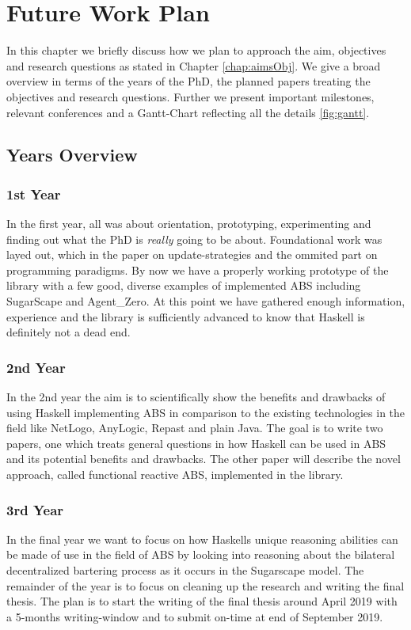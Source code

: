 \chapter{Future Work Plan}
\label{chap:future}

In this chapter we briefly discuss how we plan to approach the aim, objectives and research questions as stated in Chapter \ref{chap:aimsObj}. We give a broad overview in terms of the years of the PhD, the planned papers treating the objectives and research questions. Further we present important milestones, relevant conferences and a Gantt-Chart reflecting all the details \ref{fig:gantt}.


\section{Years Overview}

\subsection{1st Year}
In the first year, all was about orientation, prototyping, experimenting and finding out what the PhD is \textit{really} going to be about. Foundational work was layed out, which in the paper on update-strategies and the ommited part on programming paradigms. By now we have a properly working prototype of the library with a few good, diverse examples of implemented ABS including SugarScape and Agent\_Zero. At this point we have gathered enough information, experience and the library is sufficiently advanced to know that Haskell is definitely not a dead end.

\subsection{2nd Year}
In the 2nd year the aim is to scientifically show the benefits and drawbacks of using Haskell implementing ABS in comparison to the existing technologies in the field like NetLogo, AnyLogic, Repast and plain Java. The goal is to write two papers, one which treats general questions in how Haskell can be used in ABS and its potential benefits and drawbacks. The other paper will describe the novel approach, called functional reactive ABS, implemented in the library. 

\subsection{3rd Year}
In the final year we want to focus on how Haskells unique reasoning abilities can be made of use in the field of ABS by looking into reasoning about the bilateral decentralized bartering process as it occurs in the Sugarscape model.
The remainder of the year is to focus on cleaning up the research and writing the final thesis. The plan is to start the writing of the final thesis around April 2019 with a 5-months writing-window and to submit on-time at end of September 2019.

